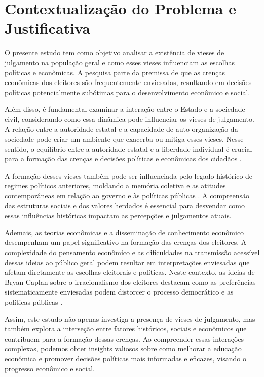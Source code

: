 \section{Contextualização do Problema e Justificativa}

O presente estudo tem como objetivo analisar a existência de vieses de julgamento na população geral e como esses vieses influenciam as escolhas políticas e econômicas. A pesquisa parte da premissa de que as crenças econômicas dos eleitores são frequentemente enviesadas, resultando em decisões políticas potencialmente subótimas para o desenvolvimento econômico e social.

Além disso, é fundamental examinar a interação entre o Estado e a sociedade civil, considerando como essa dinâmica pode influenciar os vieses de julgamento. A relação entre a autoridade estatal e a capacidade de auto-organização da sociedade pode criar um ambiente que exacerba ou mitiga esses vieses. Nesse sentido, o equilíbrio entre a autoridade estatal e a liberdade individual é crucial para a formação das crenças e decisões políticas e econômicas dos cidadãos \cite{acemoglu2019narrow}.

A formação desses vieses também pode ser influenciada pelo legado histórico de regimes políticos anteriores, moldando a memória coletiva e as atitudes contemporâneas em relação ao governo e às políticas públicas \cite{regime_memory}. A compreensão das estruturas sociais e dos valores herdados é essencial para desvendar como essas influências históricas impactam as percepções e julgamentos atuais.

Ademais, as teorias econômicas e a disseminação de conhecimento econômico desempenham um papel significativo na formação das crenças dos eleitores. A complexidade do pensamento econômico e as dificuldades na transmissão acessível dessas ideias ao público geral podem resultar em interpretações enviesadas que afetam diretamente as escolhas eleitorais e políticas. Neste contexto, as ideias de Bryan Caplan sobre o irracionalismo dos eleitores destacam como as preferências sistematicamente enviesadas podem distorcer o processo democrático e as políticas públicas \cite{The_Myth_of_the_Rational_Voter}.

Assim, este estudo não apenas investiga a presença de vieses de julgamento, mas também explora a interseção entre fatores históricos, sociais e econômicos que contribuem para a formação dessas crenças. Ao compreender essas interações complexas, podemos obter insights valiosos sobre como melhorar a educação econômica e promover decisões políticas mais informadas e eficazes, visando o progresso econômico e social.

